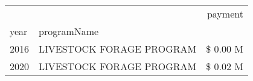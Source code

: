 \begin{tabular}{llr}
\toprule
 &  & payment \\
year & programName &  \\
\midrule
2016 & LIVESTOCK FORAGE PROGRAM & \$ 0.00 M \\
\cline{1-3}
2020 & LIVESTOCK FORAGE PROGRAM & \$ 0.02 M \\
\cline{1-3}
\bottomrule
\end{tabular}
